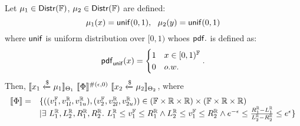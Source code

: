 \documentclass[a4paper,11pt]{article}
\begin{document}
%
\newpage
\begin{thm}
\label{thm:unif_coupling}
Let $\mu_1 \in \mathsf{Distr}(\mathbb{F})$, $\mu_2 \in \mathsf{Distr}(\mathbb{F})$ are defined:
\[
	\mu_1(x) = \mathsf{unif}(0, 1),
~~
	\mu_2(y) = \mathsf{unif}(0, 1)
\]
where $\mathsf{unif}$ is uniform distribution over $[0, 1)$ whoes $\mathsf{pdf}.$ is defined as:
\[
	\mathsf{pdf}_{\mathsf{unif}}(x) = 
	\begin{cases}
	1 & x \in [0, 1)^{\mathbb{F}}\\
	0       & o.w.
	\end{cases}.
\]
Then, $	\llbracket x_1 \xleftarrow{\$} \mu_1 \rrbracket_{\Theta_1} 
		~ \llbracket \Phi \rrbracket^{\#(\epsilon, 0)} ~
		\llbracket x_2 \xleftarrow{\$} \mu_2 \rrbracket_{\Theta_2}$, 
where
\[
\begin{array}{rl}
	\llbracket \Phi \rrbracket = &
	\{((v^{\mathbb{F}}_1, v^{\mathbb{R}}_{1l}, v^{\mathbb{R}}_{1u}), (v^{\mathbb{F}}_2, v^{\mathbb{R}}_{2l}, v^{\mathbb{R}}_{2u})) 
	\in (\mathbb{F} \times \mathbb{R} \times \mathbb{R}) \times (\mathbb{F} \times \mathbb{R} \times \mathbb{R})\\
	& |
	\exists ~ L^{\mathbb{R}}_1, L^{\mathbb{R}}_2, R^{\mathbb{R}}_1, R^{\mathbb{R}}_2. ~
	L^{\mathbb{R}}_1 \leq v^{\mathbb{F}}_1 \leq R^{\mathbb{R}}_1 
	\land 
	L^{\mathbb{R}}_2 \leq v^{\mathbb{F}}_1 \leq R^{\mathbb{R}}_2
	\land
	e^{-\epsilon} \leq 
	\frac{R^{\mathbb{R}}_1 - L^{\mathbb{R}}_1}{L^{\mathbb{R}}_2 - R^{\mathbb{R}}_2}
	\leq e^{\epsilon}
	\}
\end{array}
\]
\end{thm}
\end{document}
